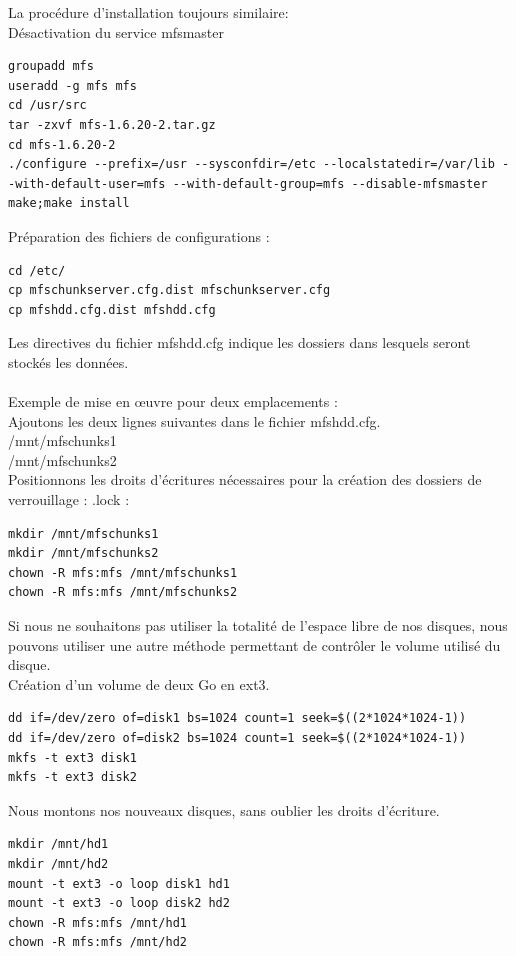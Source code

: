 \documentclass[12pt]{report}
\begin{document}
La procédure d'installation toujours similaire:\\
Désactivation du service mfsmaster\\
  \begin{lstlisting}
groupadd mfs
useradd -g mfs mfs
cd /usr/src
tar -zxvf mfs-1.6.20-2.tar.gz
cd mfs-1.6.20-2
./configure --prefix=/usr --sysconfdir=/etc --localstatedir=/var/lib --with-default-user=mfs --with-default-group=mfs --disable-mfsmaster
make;make install
	  \end{lstlisting}
Préparation des fichiers de configurations :\\
  \begin{lstlisting}
cd /etc/
cp mfschunkserver.cfg.dist mfschunkserver.cfg
cp mfshdd.cfg.dist mfshdd.cfg
	  \end{lstlisting}
Les directives du fichier mfshdd.cfg indique les dossiers dans lesquels seront stockés les données.\\\\
Exemple de mise en œuvre pour deux emplacements :\\
Ajoutons les deux lignes suivantes dans le fichier mfshdd.cfg.\\
/mnt/mfschunks1\\
/mnt/mfschunks2\\
Positionnons les droits d'écritures nécessaires pour la création des dossiers de verrouillage : .lock :\\
  \begin{lstlisting}
mkdir /mnt/mfschunks1
mkdir /mnt/mfschunks2
chown -R mfs:mfs /mnt/mfschunks1
chown -R mfs:mfs /mnt/mfschunks2
	  \end{lstlisting}
Si nous ne souhaitons pas utiliser la totalité de l'espace libre de nos disques, nous pouvons utiliser une autre méthode permettant de contrôler le volume utilisé du disque.\\
Création d'un volume de deux Go en ext3.\\
  \begin{lstlisting}
dd if=/dev/zero of=disk1 bs=1024 count=1 seek=$((2*1024*1024-1))
dd if=/dev/zero of=disk2 bs=1024 count=1 seek=$((2*1024*1024-1))
mkfs -t ext3 disk1
mkfs -t ext3 disk2
	  \end{lstlisting}
Nous montons nos nouveaux disques, sans oublier les droits d'écriture.\\
  \begin{lstlisting}
mkdir /mnt/hd1
mkdir /mnt/hd2
mount -t ext3 -o loop disk1 hd1
mount -t ext3 -o loop disk2 hd2
chown -R mfs:mfs /mnt/hd1
chown -R mfs:mfs /mnt/hd2
	  \end{lstlisting}
\end{document}
